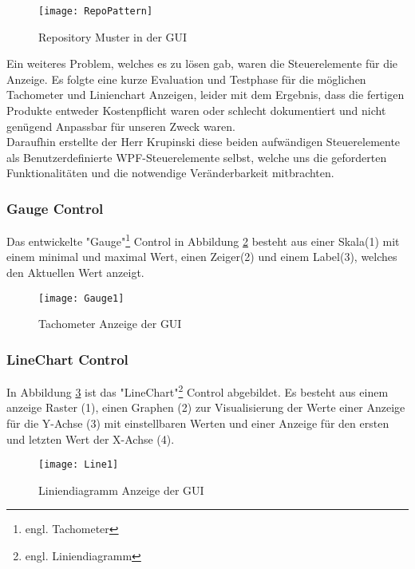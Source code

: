 \begin{figure}[ht]
	\centering
		\texttt{[image: RepoPattern]}
		\caption{Repository Muster in der GUI}
		\label{fig:repo}
\end{figure}

Ein weiteres Problem, welches es zu lösen gab, waren die Steuerelemente für die Anzeige. Es folgte eine kurze Evaluation und Testphase für die möglichen Tachometer und Linienchart Anzeigen, leider mit dem Ergebnis, dass die fertigen Produkte entweder Kostenpflicht waren oder schlecht dokumentiert und nicht genügend Anpassbar für unseren Zweck waren.\\

Daraufhin erstellte der Herr Krupinski diese beiden aufwändigen Steuerelemente als Benutzerdefinierte WPF-Steuerelemente selbst, welche uns die geforderten Funktionalitäten und die notwendige Veränderbarkeit mitbrachten. 



\subsubsection*{Gauge Control}
Das entwickelte "Gauge"\footnote{engl. Tachometer} Control in Abbildung \ref{fig:gauge} besteht aus einer Skala(1) mit einem minimal und maximal Wert, einen Zeiger(2) und einem Label(3), welches den Aktuellen Wert anzeigt.

\begin{figure}[ht]
	\centering
		\texttt{[image: Gauge1]}
		\caption{Tachometer Anzeige der GUI}
		\label{fig:gauge}
\end{figure}
\newpage


\subsubsection*{LineChart Control}

In Abbildung \ref{fig:line} ist das "LineChart"\footnote{engl. Liniendiagramm} Control abgebildet. Es besteht aus einem anzeige Raster (1), einen Graphen (2) zur Visualisierung der Werte einer Anzeige für die Y-Achse (3) mit einstellbaren Werten und einer Anzeige für den ersten und letzten Wert der X-Achse (4).

\begin{figure}[ht]
	\centering
		\texttt{[image: Line1]}
		\caption{Liniendiagramm Anzeige der GUI}
		\label{fig:line}
\end{figure}

